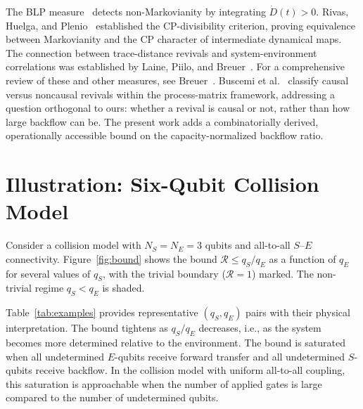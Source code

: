 \documentclass[aps,pra,twocolumn,superscriptaddress,hyperref]{revtex4-2}
\begin{document}
The BLP measure~\cite{Breuer:2009, Breuer:2016} detects non-Markovianity by integrating $\dot{D}(t) > 0$. Rivas, Huelga, and Plenio~\cite{Rivas:2010} established the CP-divisibility criterion, proving equivalence between Markovianity and the CP character of intermediate dynamical maps. The connection between trace-distance revivals and system-environment correlations was established by Laine, Piilo, and Breuer~\cite{Laine:2010}. For a comprehensive review of these and other measures, see Breuer~\cite{Breuer:2012}. Buscemi et al.~\cite{Buscemi:2025} classify causal versus noncausal revivals within the process-matrix framework, addressing a question orthogonal to ours: whether a revival is causal or not, rather than how large backflow can be. The present work adds a combinatorially derived, operationally accessible bound on the capacity-normalized backflow ratio.

\section{Illustration: Six-Qubit Collision Model}

Consider a collision model with $N_S = N_E = 3$ qubits and all-to-all $S$--$E$ connectivity. Figure~\ref{fig:bound} shows the bound $\mathcal{R} \leq q_S/q_E$ as a function of $q_E$ for several values of $q_S$, with the trivial boundary ($\mathcal{R}=1$) marked. The non-trivial regime $q_S < q_E$ is shaded.

Table~\ref{tab:examples} provides representative $(q_S, q_E)$ pairs with their physical interpretation. The bound tightens as $q_S/q_E$ decreases, i.e., as the system becomes more determined relative to the environment. The bound is saturated when all undetermined $E$-qubits receive forward transfer and all undetermined $S$-qubits receive backflow. In the collision model with uniform all-to-all coupling, this saturation is approachable when the number of applied gates is large compared to the number of undetermined qubits.
\end{document}
